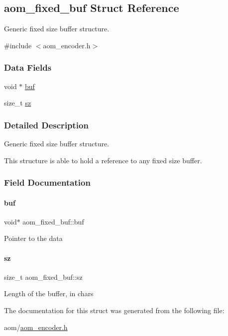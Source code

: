 \hypertarget{structaom__fixed__buf}{}\subsection{aom\+\_\+fixed\+\_\+buf Struct Reference}
\label{structaom__fixed__buf}


Generic fixed size buffer structure.  




{\ttfamily \#include $<$aom\+\_\+encoder.\+h$>$}

\subsubsection*{Data Fields}
\begin{DoxyCompactItemize}
\item 
void $\ast$ \hyperlink{structaom__fixed__buf_ac1b22da152c9839329d3780208dffd38}{buf}
\item 
size\+\_\+t \hyperlink{structaom__fixed__buf_a02f47e8b960c332c60a8aa4b7e37426f}{sz}
\end{DoxyCompactItemize}


\subsubsection{Detailed Description}
Generic fixed size buffer structure. 

This structure is able to hold a reference to any fixed size buffer. 

\subsubsection{Field Documentation}
\mbox{\label{structaom__fixed__buf_ac1b22da152c9839329d3780208dffd38}} 
\paragraph{\texorpdfstring{buf}{buf}}
{\footnotesize\ttfamily void$\ast$ aom\+\_\+fixed\+\_\+buf\+::buf}

Pointer to the data \mbox{\label{structaom__fixed__buf_a02f47e8b960c332c60a8aa4b7e37426f}} 
\paragraph{\texorpdfstring{sz}{sz}}
{\footnotesize\ttfamily size\+\_\+t aom\+\_\+fixed\+\_\+buf\+::sz}

Length of the buffer, in chars 

The documentation for this struct was generated from the following file\+:\begin{DoxyCompactItemize}
\item 
aom/\hyperlink{aom__encoder_8h}{aom\+\_\+encoder.\+h}\end{DoxyCompactItemize}
